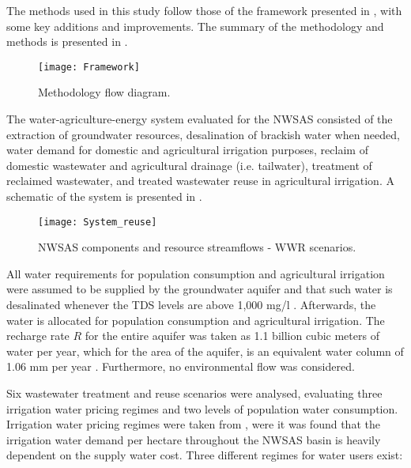 The methods used in this study follow those of the framework presented in \cite{ramirezgomezTechnoeconomicGISbasedModel2018}, with some key additions and improvements. The summary of the methodology and methods is presented in .

\begin{figure*}[!h]
	\centering
	\texttt{[image: Framework]}
	\caption{Methodology flow diagram.}
	\label{fig:framework}
\end{figure*}

The water-agriculture-energy system evaluated for the NWSAS consisted of the extraction of groundwater resources, desalination of brackish water when needed, water demand for domestic and agricultural irrigation purposes, reclaim of domestic wastewater and agricultural drainage (i.e. tailwater), treatment of reclaimed wastewater, and treated wastewater reuse in agricultural irrigation. A schematic of the system is presented in .

\begin{figure*}[!h]
	\centering
	\texttt{[image: System\_reuse]}
	\caption{NWSAS components and resource streamflows - WWR scenarios.}
	\label{fig:system_reuse}
\end{figure*}

All water requirements for population consumption and agricultural irrigation were assumed to be supplied by the groundwater aquifer and that such water is desalinated whenever the TDS levels are above 1,000 mg/l \cite{fao1985water}. Afterwards, the water is allocated for population consumption and agricultural irrigation. 
The recharge rate $R$ for the entire aquifer was taken as 1.1 billion cubic meters of water per year, which for the area of the aquifer, is an equivalent water column of 1.06 mm per year \cite{BetterValorizationIrrigation2015}. Furthermore, no environmental flow was considered.

Six wastewater treatment and reuse scenarios were analysed, evaluating three irrigation water pricing regimes and two levels of population water consumption. Irrigation water pricing regimes were taken from \cite{Socioeconomicaspectsirrigation2014}, were it was found that the irrigation water demand per hectare throughout the NWSAS basin is heavily dependent on the supply water cost. Three different regimes for water users exist: 

